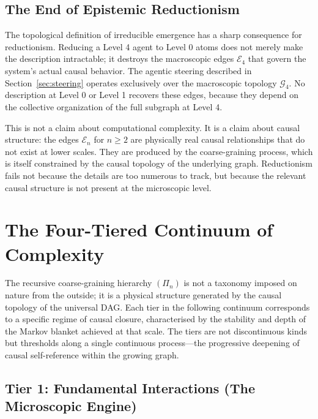 \documentclass[11pt,a4paper]{article}
\theoremstyle{remark}
\newcommand{\GG}{\mathcal{G}}
\newcommand{\EE}{\mathcal{E}}
\begin{document}
\subsection{The End of Epistemic Reductionism}

The topological definition of irreducible emergence has a sharp consequence for
reductionism. Reducing a Level 4 agent to Level 0 atoms does not merely make the
description intractable; it destroys the macroscopic edges $\EE_4$ that govern
the system's actual causal behavior. The agentic steering described in
Section~\ref{sec:steering} operates exclusively over the macroscopic topology
$\GG_4$. No description at Level 0 or Level 1 recovers these edges, because they
depend on the collective organization of the full subgraph at Level 4.

This is not a claim about computational complexity. It is a claim about causal
structure: the edges $\EE_n$ for $n \geq 2$ are physically real causal
relationships that do not exist at lower scales. They are produced by the
coarse-graining process, which is itself constrained by the causal topology of
the underlying graph. Reductionism fails not because the details are too numerous
to track, but because the relevant causal structure is not present at the
microscopic level.

\section{The Four-Tiered Continuum of Complexity}
\label{sec:continuum}

The recursive coarse-graining hierarchy $(\Pi_n)$ is not a taxonomy imposed on
nature from the outside; it is a physical structure generated by the causal
topology of the universal DAG. Each tier in the following continuum corresponds
to a specific regime of causal closure, characterised by the stability and
depth of the Markov blanket achieved at that scale. The tiers are not
discontinuous kinds but thresholds along a single continuous process---the
progressive deepening of causal self-reference within the growing graph.

\subsection{Tier 1: Fundamental Interactions (The Microscopic Engine)}
\end{document}

